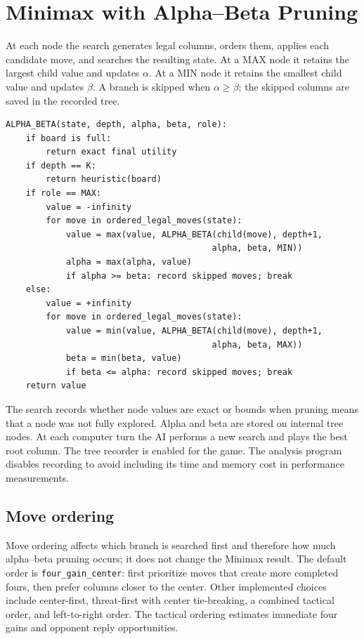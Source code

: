 \documentclass[11pt,a4paper]{article}
\begin{document}
\section{Minimax with Alpha--Beta Pruning}

At each node the search generates legal columns, orders them, applies each
candidate move, and searches the resulting state. At a MAX node it retains the
largest child value and updates $\alpha$. At a MIN node it retains the smallest
child value and updates $\beta$. A branch is skipped when $\alpha\geq\beta$;
the skipped columns are saved in the recorded tree.

\begin{lstlisting}
ALPHA_BETA(state, depth, alpha, beta, role):
    if board is full:
        return exact final utility
    if depth == K:
        return heuristic(board)
    if role == MAX:
        value = -infinity
        for move in ordered_legal_moves(state):
            value = max(value, ALPHA_BETA(child(move), depth+1,
                                         alpha, beta, MIN))
            alpha = max(alpha, value)
            if alpha >= beta: record skipped moves; break
    else:
        value = +infinity
        for move in ordered_legal_moves(state):
            value = min(value, ALPHA_BETA(child(move), depth+1,
                                         alpha, beta, MAX))
            beta = min(beta, value)
            if beta <= alpha: record skipped moves; break
    return value
\end{lstlisting}

The search records whether node values are exact or bounds when pruning means
that a node was not fully explored. Alpha and beta are stored on internal tree
nodes. At each computer turn the AI performs a new search and plays the best
root column. The tree recorder is enabled for the game. The analysis program
disables recording to avoid including its time and memory cost in performance
measurements.

\subsection{Move ordering}
Move ordering affects which branch is searched first and therefore how much
alpha--beta pruning occurs; it does not change the Minimax result. The default
order is \texttt{four\_gain\_center}: first prioritize moves that create more
completed fours, then prefer columns closer to the center. Other implemented
choices include center-first, threat-first with center tie-breaking, a combined
tactical order, and left-to-right order. The tactical ordering estimates
immediate four gains and opponent reply opportunities.
\end{document}
